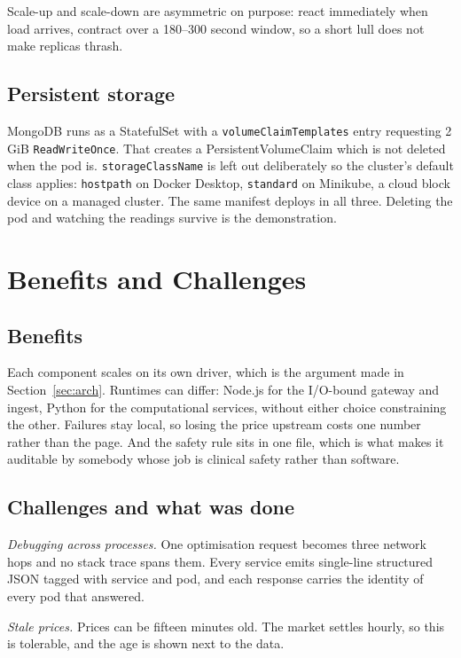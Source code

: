 \documentclass[conference]{IEEEtran}
\begin{document}
Scale-up and scale-down are asymmetric on purpose: react immediately when load
arrives, contract over a 180--300 second window, so a short lull does not make
replicas thrash.

\subsection{Persistent storage}

MongoDB runs as a StatefulSet with a \texttt{volumeClaimTemplates} entry
requesting 2 GiB \texttt{ReadWriteOnce}. That creates a PersistentVolumeClaim
which is not deleted when the pod is. \texttt{storageClassName} is left out
deliberately so the cluster's default class applies: \texttt{hostpath} on Docker
Desktop, \texttt{standard} on Minikube, a cloud block device on a managed
cluster. The same manifest deploys in all three. Deleting the pod and watching
the readings survive is the demonstration.

\section{Benefits and Challenges}

\subsection{Benefits}

Each component scales on its own driver, which is the argument made in
Section~\ref{sec:arch}. Runtimes can differ: Node.js for the I/O-bound gateway
and ingest, Python for the computational services, without either choice
constraining the other. Failures stay local, so losing the price upstream costs
one number rather than the page. And the safety rule sits in one file, which is
what makes it auditable by somebody whose job is clinical safety rather than
software.

\subsection{Challenges and what was done}

\emph{Debugging across processes.} One optimisation request becomes three
network hops and no stack trace spans them. Every service emits single-line
structured JSON tagged with service and pod, and each response carries the
identity of every pod that answered.

\emph{Stale prices.} Prices can be fifteen minutes old. The market settles
hourly, so this is tolerable, and the age is shown next to the data.
\end{document}
